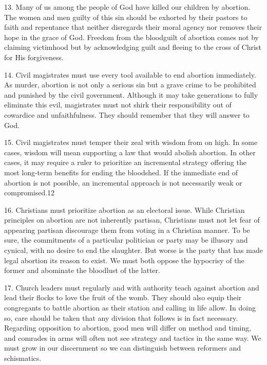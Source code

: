 \documentclass[
]{book}
\begin{document}
\protect\hypertarget{dda-statement-13}{\href{}{}}13. Many of us among the people of God have killed our children by abortion. The women and men guilty of this sin should be exhorted by their pastors to faith and repentance that neither disregards their moral agency nor removes their hope in the grace of God. Freedom from the bloodguilt of abortion comes not by claiming victimhood but by acknowledging guilt and fleeing to the cross of Christ for His forgiveness.

\protect\hypertarget{dda-statement-14}{\href{}{}}14. Civil magistrates must use every tool available to end abortion immediately. As murder, abortion is not only a serious sin but a grave crime to be prohibited and punished by the civil government. Although it may take generations to fully eliminate this evil, magistrates must not shirk their responsibility out of cowardice and unfaithfulness. They should remember that they will answer to God.

\protect\hypertarget{dda-statement-15}{\href{}{}}15. Civil magistrates must temper their zeal with wisdom from on high. In some cases, wisdom will mean supporting a law that would abolish abortion. In other cases, it may require a ruler to prioritize an incremental strategy offering the most long-term benefits for ending the bloodshed. If the immediate end of abortion is not possible, an incremental approach is not necessarily weak or compromised.12

\protect\hypertarget{dda-statement-16}{\href{}{}}16. Christians must prioritize abortion as an electoral issue. While Christian principles on abortion are not inherently partisan, Christians must not let fear of appearing partisan discourage them from voting in a Christian manner. To be sure, the commitments of a particular politician or party may be illusory and cynical, with no desire to end the slaughter. But worse is the party that has made legal abortion its reason to exist. We must both oppose the hypocrisy of the former and abominate the bloodlust of the latter.

\protect\hypertarget{dda-statement-17}{\href{}{}}17. Church leaders must regularly and with authority teach against abortion and lead their flocks to love the fruit of the womb. They should also equip their congregants to battle abortion as their station and calling in life allow. In doing so, care should be taken that any division that follows is in fact necessary. Regarding opposition to abortion, good men will differ on method and timing, and comrades in arms will often not see strategy and tactics in the same way. We must grow in our discernment so we can distinguish between reformers and schismatics.
\end{document}
